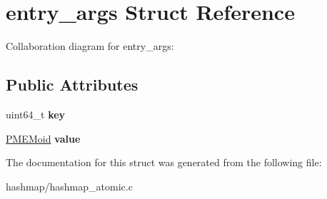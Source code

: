 \hypertarget{structentry__args}{}\section{entry\+\_\+args Struct Reference}
\label{structentry__args}


Collaboration diagram for entry\+\_\+args\+:
\subsection*{Public Attributes}
\begin{DoxyCompactItemize}
\item 
\mbox{\label{structentry__args_aba46158e3af0f0f4701ea742f7e05697}} 
uint64\+\_\+t {\bfseries key}
\item 
\mbox{\label{structentry__args_a8a910e88fcd1bb7d94aa52080d6abb08}} 
\hyperlink{structpmemoid}{P\+M\+E\+Moid} {\bfseries value}
\end{DoxyCompactItemize}


The documentation for this struct was generated from the following file\+:\begin{DoxyCompactItemize}
\item 
hashmap/hashmap\+\_\+atomic.\+c\end{DoxyCompactItemize}
